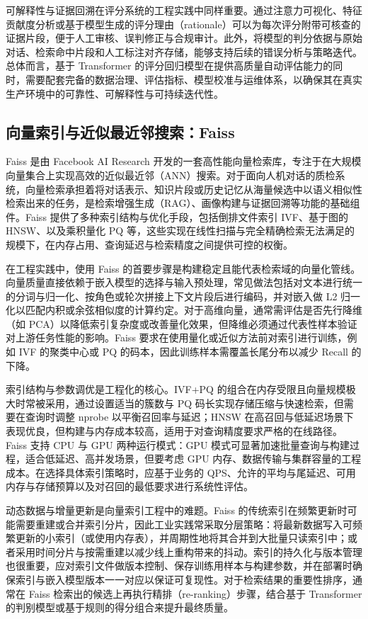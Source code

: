 可解释性与证据回溯在评分系统的工程实践中同样重要。通过注意力可视化、特征贡献度分析或基于模型生成的评分理由（rationale）可以为每次评分附带可核查的证据片段\cite{katz-belinkov-2023-visit}，便于人工审核、误判修正与合规审计。此外，将模型的判分依据与原始对话、检索命中片段和人工标注对齐存储，能够支持后续的错误分析与策略迭代。总体而言，基于 Transformer 的评分回归模型在提供高质量自动评估能力的同时，需要配套完备的数据治理、评估指标、模型校准与运维体系，以确保其在真实生产环境中的可靠性、可解释性与可持续迭代性。
\subsection{向量索引与近似最近邻搜索：Faiss}
Faiss 是由 Facebook AI Research 开发的一套高性能向量检索库，专注于在大规模向量集合上实现高效的近似最近邻（ANN）搜索。对于面向人机对话的质检系统，向量检索承担着将对话表示、知识片段或历史记忆从海量候选中以语义相似性检索出来的任务，是检索增强生成（RAG）、画像构建与证据回溯等功能的基础组件。Faiss 提供了多种索引结构与优化手段，包括倒排文件索引 IVF、基于图的 HNSW、以及乘积量化 PQ 等，这些实现在线性扫描与完全精确检索无法满足的规模下，在内存占用、查询延迟与检索精度之间提供可控的权衡\cite{douze2025faisslibrary}。

在工程实践中，使用 Faiss 的首要步骤是构建稳定且能代表检索域的向量化管线。向量质量直接依赖于嵌入模型的选择与输入预处理，常见做法包括对文本进行统一的分词与归一化、按角色或轮次拼接上下文片段后进行编码，并对嵌入做 L2 归一化以匹配内积或余弦相似度的计算约定。对于高维向量，通常需评估是否先行降维（如 PCA）以降低索引复杂度或改善量化效果，但降维必须通过代表性样本验证对上游任务性能的影响。Faiss 要求在使用量化或近似方法前对索引进行训练，例如 IVF 的聚类中心或 PQ 的码本，因此训练样本需覆盖长尾分布以减少 Recall 的下降。

索引结构与参数调优是工程化的核心。IVF+PQ 的组合在内存受限且向量规模极大时常被采用，通过设置适当的簇数与 PQ 码长实现存储压缩与快速检索\cite{yonathan_2025_16919191}，但需要在查询时调整 nprobe 以平衡召回率与延迟；HNSW 在高召回与低延迟场景下表现优良，但构建与内存成本较高，适用于对查询精度要求严格的在线路径\cite{8594636}。Faiss 支持 CPU 与 GPU 两种运行模式：GPU 模式可显著加速批量查询与构建过程，适合低延迟、高并发场景，但要考虑 GPU 内存、数据传输与集群容量的工程成本。在选择具体索引策略时，应基于业务的 QPS、允许的平均与尾延迟、可用内存与存储预算以及对召回的最低要求进行系统性评估\cite{8733051}。

动态数据与增量更新是向量索引工程中的难题。Faiss 的传统索引在频繁更新时可能需要重建或合并索引分片，因此工业实践常采取分层策略：将最新数据写入可频繁更新的小索引（或使用内存表），并周期性地将其合并到大批量只读索引中；或者采用时间分片与按需重建以减少线上重构带来的抖动。索引的持久化与版本管理也很重要，应对索引文件做版本控制、保存训练用样本与构建参数，并在部署时确保索引与嵌入模型版本一一对应以保证可复现性。对于检索结果的重要性排序，通常在 Faiss 检索出的候选上再执行精排（re-ranking）步骤，结合基于 Transformer 的判别模型或基于规则的得分组合来提升最终质量。

